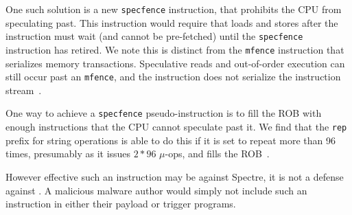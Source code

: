 One such solution is a new \texttt{specfence} instruction, that prohibits the
CPU from speculating past. This instruction would require that loads and stores after
the instruction must wait (and cannot be pre-fetched) until the
\texttt{specfence} instruction has retired. We note this is distinct from the
\texttt{mfence} instruction that serializes memory transactions. Speculative
reads and out-of-order execution can still occur past an \texttt{mfence}, and
the instruction does not serialize the instruction
stream~\cite{intel-software-guide}.

One way to achieve a \texttt{specfence} pseudo-instruction is to fill the ROB
with enough instructions that the CPU cannot speculate past it. We find that the
\texttt{rep} prefix for string operations is able to do this if it is set to 
repeat more than 96 times, presumably as it issues $2*96$ $\mu$-ops, and fills the
ROB~\cite{intel-instruction-tables}.

However effective such an instruction may be against Spectre, it is not a
defense against \speculake. A malicious \speculake malware author would simply
not include such an instruction in either their payload or trigger programs.
\fi

%

